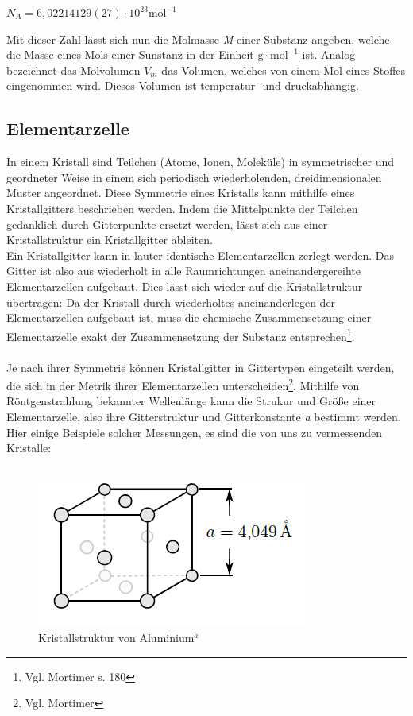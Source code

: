 \documentclass[12pt,a4paper,titlepage,headinclude,bibtotoc]{scrartcl}
\begin{document}
\begin{center}
$N_{A}=6,02214129(27)\cdot 10^{23}\mathrm{mol^{-1}}$ 
\end{center}

Mit dieser Zahl lässt sich nun die Molmasse \textit{M} einer Substanz angeben, welche die Masse eines Mols einer Sunstanz in der Einheit $ \mathrm{g \cdot mol^{-1}}$ ist. Analog bezeichnet das Molvolumen $V_{m}$ das Volumen, welches von einem Mol eines Stoffes eingenommen wird. Dieses Volumen ist temperatur- und druckabhängig.

\subsection{Elementarzelle}
In einem Kristall sind Teilchen (Atome, Ionen, Moleküle) in symmetrischer und geordneter Weise in einem sich periodisch wiederholenden, dreidimensionalen Muster angeordnet. Diese Symmetrie eines Kristalls kann mithilfe eines Kristallgitters beschrieben werden. Indem die Mittelpunkte der Teilchen gedanklich durch Gitterpunkte ersetzt werden, lässt sich aus einer Kristallstruktur ein Kristallgitter ableiten.\\
Ein Kristallgitter kann in lauter identische Elementarzellen zerlegt werden. Das Gitter ist also aus wiederholt in alle Raumrichtungen aneinandergereihte Elementarzellen aufgebaut. Dies lässt sich wieder auf die Kristallstruktur übertragen: Da der Kristall durch wiederholtes aneinanderlegen der Elementarzellen aufgebaut ist, muss die chemische Zusammensetzung einer Elementarzelle exakt der Zusammensetzung der Substanz entsprechen\footnote{Vgl. Mortimer s. 180}.\\\\
Je nach ihrer Symmetrie können Kristallgitter in Gittertypen eingeteilt werden, die sich in der Metrik ihrer Elementarzellen unterscheiden\footnote{Vgl. Mortimer}. Mithilfe von Röntgenstrahlung bekannter Wellenlänge kann die Strukur und Größe einer Elementarzelle, also ihre Gitterstruktur und Gitterkonstante \textit{a} bestimmt werden. Hier einige Beispiele solcher Messungen, es sind die von uns zu vermessenden Kristalle:\\\\


\begin{figure} [h]
\begin{center}
\includegraphics[scale=0.7]{Aluminium.png} \end{center}
\caption{Kristallstruktur von Aluminium$^a$}
\end{figure}
\end{document}
